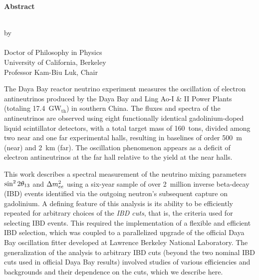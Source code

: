 \MyDoubleSpacing

\begin{center}
  \mylarge
  \textbf{Abstract}

  \vspace{1.5\baselineskip}
  \MyTitle\\
  \vspace{\baselineskip} by\\
  \vspace{\baselineskip} \MyAuthor\\
  Doctor of Philosophy in Physics\\
  University of California, Berkeley\\
  Professor Kam-Biu Luk, Chair
  \vspace{\baselineskip}
\end{center}

\normalsize
\MyDoubleSpacing
\noindent
%
The Daya Bay reactor neutrino experiment measures the oscillation of electron antineutrinos produced by the Daya Bay and Ling Ao-I \& II Power Plants (totaling 17.4~GW$_\mathrm{th}$) in southern China. The fluxes and spectra of the antineutrinos are observed using eight functionally identical gadolinium-doped liquid scintillator detectors, with a total target mass of 160~tons, divided among two near and one far experimental halls, resulting in baselines of order 500~m (near) and 2~km (far). The oscillation phenomenon appears as a deficit of electron antineutrinos at the far hall relative to the yield at the near halls.

This work describes a spectral measurement of the neutrino mixing parameters $\sin^2 2\theta_{13}$ and $\Delta m^2_{ee}$ using a six-year sample of over 2~million inverse beta-decay (IBD) events identified via the outgoing neutron's subsequent capture on gadolinium. A defining feature of this analysis is its ability to be efficiently repeated for arbitrary choices of the \emph{IBD cuts}, that is, the criteria used for selecting IBD events. This required the implementation of a flexible and efficient IBD selection, which was coupled to a parallelized upgrade of the official Daya Bay oscillation fitter developed at Lawrence Berkeley National Laboratory. The generalization of the analysis to arbitrary IBD cuts (beyond the two nominal IBD cuts used in official Daya Bay results) involved studies of various efficiencies and backgrounds and their dependence on the cuts, which we describe here.

